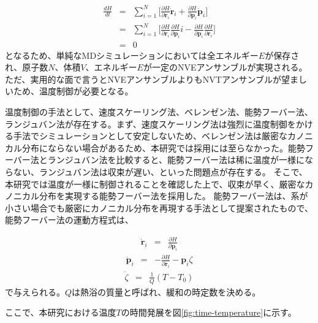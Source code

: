 \documentclass[titlepage]{jsreport}
\begin{document}
\large
\begin{eqnarray}
\frac{dH}{dt} &=& \sum_{i=1}^N\Bigg[\frac{\partial H}{\partial \mathbf{r}_i}\dot{\mathbf{r}}_i+\frac{\partial H}{\partial \mathbf{p}_i}\dot{\mathbf{p}}_i\Bigg] \nonumber \\
              &=&  \sum_{i=1}^N\Bigg[\frac{\partial H}{\partial \mathbf{r}_i}\frac{\partial H}{\partial \mathbf{p}_i}i-\frac{\partial H}{\partial \mathbf{p}_i}\frac{\partial H}{\partial \mathbf{r}_i}\Bigg] \nonumber \\
              &=& 0 \label{eq:molecular-dynamics-hamilton-H}
\end{eqnarray}
\normalsize
となるため、単純なMDシミュレーションにおいては全エネルギー$E$が保存され、原子数$N$、体積$V$、エネルギー$E$が一定のNVEアンサンブルが実現される。
ただ、実用的な面で言うとNVEアンサンブルよりもNVTアンサンブルが望ましいため、温度制御が必要となる。

温度制御の手法として、速度スケーリング法\cite{velocity-scaling}、ベレンゼン法\cite{berendsen}、能勢フーバー法\cite{nose,hoover}、ランジュバン法\cite{langevin}が存在する。まず、速度スケーリング法は強烈に温度制御をかける手法でシミュレーションとして安定しないため、ベレンゼン法は厳密なカノニカル分布にならない場合があるため、本研究では採用には至らなかった。能勢フーバー法とランジュバン法を比較すると、能勢フーバー法は稀に温度が一様にならない、ランジュバン法は収束が遅い、といった問題点が存在する。
そこで、本研究では温度が一様に制御されることを確認した上で、収束が早く、厳密なカノニカル分布を実現する能勢フーバー法を採用した。
能勢フーバー法は、系が小さい場合でも厳密にカノニカル分布を再現する手法として提案されたもので、能勢フーバー法の運動方程式は、

\large
\begin{eqnarray}
\dot{\mathbf{r}}_i &=& \frac{\partial H}{\partial \mathbf{p}_i} \label{eq:nose-hoover-r}
\end{eqnarray}
\normalsize
\large
\begin{eqnarray}
\dot{\mathbf{p}}_i &=& -\frac{\partial H}{\partial \mathbf{r}_i}-\mathbf{p}_i\zeta \label{eq:nose-hoover-p}
\end{eqnarray}
\normalsize
\large
\begin{eqnarray}
\dot{\zeta} &=& \frac{1}{Q}(T-T_0) \label{eq:nose-hoover-zeta}
\end{eqnarray}
\normalsize
で与えられる。$Q$は熱浴の質量と呼ばれ、緩和の時定数を決める。

ここで、本研究における温度$T$の時間発展を図\ref{fig:time-temperature}に示す。
\end{document}

